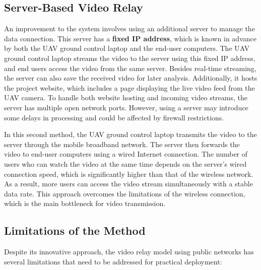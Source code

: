 \subsection{Server-Based Video Relay}
An improvement to the system involves using an additional server to manage the data connection. This server has a \textbf{fixed IP address}, which is known in advance by both the UAV ground control laptop and the end-user computers. The UAV ground control laptop streams the video to the server using this fixed IP address, and end users access the video from the same server. Besides real-time streaming, the server can also save the received video for later analysis. Additionally, it hosts the project website, which includes a page displaying the live video feed from the UAV camera. To handle both website hosting and incoming video streams, the server has multiple open network ports. However, using a server may introduce some delays in processing and could be affected by firewall restrictions.

\vspace{\baselineskip} %

In this second method, the UAV ground control laptop transmits the video to the server through the mobile broadband network. The server then forwards the video to end-user computers using a wired Internet connection. The number of users who can watch the video at the same time depends on the server's wired connection speed, which is significantly higher than that of the wireless network. As a result, more users can access the video stream simultaneously with a stable data rate. This approach overcomes the limitations of the wireless connection, which is the main bottleneck for video transmission.

\vspace{\baselineskip} %

\subsection{Limitations of the Method}
Despite its innovative approach, the video relay model using public networks has several limitations that need to be addressed for practical deployment:

